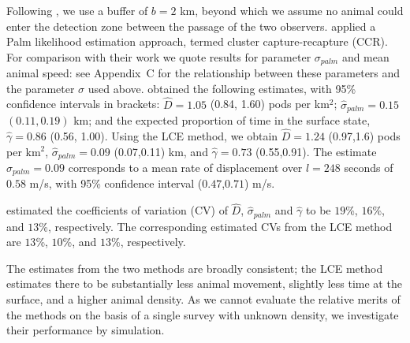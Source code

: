 \documentclass[useAMS, usenatbib, referee]{biom}\usepackage[]{graphicx}\usepackage[]{color}
\begin{document}




Following \cite{Stevenson+al:19}, we use a buffer of $b=2$ km, beyond which we assume no animal could enter the detection zone between the passage of the two observers.  \cite{Stevenson+al:19} applied a Palm likelihood estimation approach, termed cluster capture-recapture (CCR).
For comparison with their work we quote results for parameter $\sigma_{palm}$ and mean animal speed: see Appendix~C for the relationship between these parameters and the parameter $\sigma$ used above. \cite{Stevenson+al:19} obtained the following estimates, with 95\% confidence intervals in brackets: $\hat{D}=1.05$ (0.84, 1.60) pods per km$^2$; $\hat{\sigma}_{palm}=0.15$ $(0.11, 0.19)$ km; and the expected proportion of time in the surface state, $\hat{\gamma}=0.86$ (0.56, 1.00). Using the LCE method, we obtain $\hat{D}=1.24$ (0.97,1.6) pods per km$^2$, $\hat{\sigma}_{palm}=0.09$ (0.07,0.11) km, and $\hat{\gamma}=0.73$ (0.55,0.91). The estimate $\hat{\sigma}_{palm}=0.09$ corresponds to a mean rate of displacement over $l=248$ seconds of $0.58$ m/s, with 95\% confidence interval ($0.47$,$0.71$) m/s.

\cite{Stevenson+al:19} estimated the coefficients of variation (CV) of $\hat{D}$, $\hat{\sigma}_{palm}$ and $\hat{\gamma}$ to be $19$\%, $16$\%, and $13$\%, respectively. The corresponding estimated CVs from the LCE method are $13$\%, $10$\%, and $13$\%, respectively.

The estimates from the two methods are broadly consistent; the LCE method estimates there to be substantially less animal movement, slightly less time at the surface, and a higher animal density. As we cannot evaluate the relative merits of the methods on the basis of a single survey with unknown density, we investigate their performance by simulation.
\end{document}
